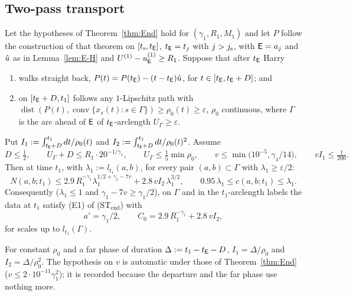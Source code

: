 \subsection{Two-pass transport}

\begin{corollary}\label{cor:E-T}
Let the hypotheses of Theorem~\ref{thm:End} hold for $(\gamma_1,R_1,M_1)$ and let $P$ follow the construction of that theorem on
$[t_{\mathrm s},t_{\mathsf E}]$, $t_{\mathsf E}=t_j$ with $j>j_{\mathrm s}$, with $\mathsf E=a_j$ and $\hat u$ as in Lemma~\ref{lem:E-H} and $U^{(1)}-u^{(1)}_{\mathsf E}\ge R_1$.
Suppose that after $t_{\mathsf E}$ Harry
\begin{enumerate}
\item[(1)] walks straight back, $P(t)=P(t_{\mathsf E})-(t-t_{\mathsf E})\hat u$, for $t\in[t_{\mathsf E},t_{\mathsf E}+D]$; and
\item[(2)] on $[t_{\mathsf E}+D,t_1]$ follows any $1$-Lipschitz path with
$\operatorname{dist}(P(t),\operatorname{conv}\{x_s(t):s\in\Gamma\})\ge\rho_0(t)\ge\varepsilon$, $\rho_0$ continuous, where $\Gamma$
is the arc ahead of $\mathsf E$ of $t_{\mathsf E}$-arclength $U_\Gamma\ge\varepsilon$.
\end{enumerate}
Put $I_1:=\int_{t_{\mathsf E}+D}^{t_1}dt/\rho_0(t)$ and $I_2:=\int_{t_{\mathsf E}+D}^{t_1}dt/\rho_0(t)^2$. Assume
\[
D\le\tfrac12,\qquad U_\Gamma+D\le R_1\cdot20^{-1/\gamma_1},\qquad U_\Gamma\le\tfrac15\min\rho_0,\qquad
v\le\min\bigl(10^{-5},\gamma_1/14\bigr),\qquad vI_1\le\tfrac1{200}.
\]
Then at time $t_1$, with $\lambda_1:=l_{t_1}(a,b)$, for every pair $(a,b)\subset\Gamma$ with $\lambda_1\ge\varepsilon/2$:
\[
N(a,b;t_1)\le2.9\,R_1^{-\gamma_1}\lambda_1^{1/2+\gamma_1-7v}+2.8\,vI_2\,\lambda_1^{3/2},\qquad
0.95\,\lambda_1\le c(a,b;t_1)\le\lambda_1 .
\]
Consequently ($\lambda_1\le1$ and $\gamma_1-7v\ge\gamma_1/2$), on $\Gamma$ and in the $t_1$-arclength labels the data at $t_1$
satisfy \textup{(E1)} of \textup{(ST$_{\mathrm{end}}$)} with
\[
a'=\gamma_1/2,\qquad C_0=2.9\,R_1^{-\gamma_1}+2.8\,vI_2,
\]
for scales up to $l_{t_1}(\Gamma)$.
\end{corollary}
For constant $\rho_0$ and a far phase of duration $\Delta:=t_1-t_{\mathsf E}-D$, $I_1=\Delta/\rho_0$ and $I_2=\Delta/\rho_0^2$. The hypothesis
on $v$ is automatic under those of Theorem~\ref{thm:End} ($v\le2\cdot10^{-11}\gamma_1^2$); it is recorded because the departure and
the far phase use nothing more.

